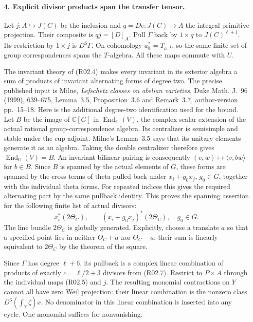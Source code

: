 \paragraph{4. Explicit divisor products span the transfer tensor.}
Let $j:A\hookrightarrow J(C)$ be the inclusion and
$q=De:J(C)\to A$ the integral primitive projection. Their composite
is $qj=[D]_A$. Pull $\Gamma$ back by $1\times q$ to
$J(C)^{\ell+1}$. Its restriction by $1\times j$ is $D^6\Gamma$.
On cohomology $a_h^*=T_{h^{-1}}$, so the same finite set of
group correspondences spans the $T$-algebra. All these maps commute
with $U$.

The invariant theory of (R02.4) makes every invariant in its exterior
algebra a sum of products of invariant alternating forms of degree
two. The precise published input is Milne, \emph{Lefschetz classes
on abelian varieties}, Duke Math. J.~96 (1999), 639--675,
Lemma~3.5, Proposition~3.6 and Remark~3.7, author-version pp.~15--18.
Here is the additional degree-two identification used for the bound.
Let $B$ be the image of $\mathbb C[G]$ in
$\operatorname{End}_{\mathbb C}(V)$, the complex scalar extension
of the actual rational group-correspondence algebra.
Its centralizer is semisimple and stable under the cup adjoint.
Milne's Lemma~3.5 says that its unitary elements generate it as an
algebra. Taking the double centralizer therefore gives
$\operatorname{End}_U(V)=B$.
An invariant bilinear pairing is consequently
$(v,w)\mapsto\langle v,bw\rangle$ for $b\in B$.
Since $B$ is spanned by the actual elements of $G$, these forms
are spanned by the cross terms of theta pulled back under
$x_i+g_0x_j$, $g_0\in G$, together with the individual theta forms.
For repeated indices this gives the required alternating part by
the same pullback identity. This proves the spanning assertion for
the following finite list of actual divisors:
\[
        x_i^*(2\Theta_C),\qquad
        (x_i+g_0x_j)^*(2\Theta_C),\quad g_0\in G.    \tag{R02.7}
\]
The line bundle $2\Theta_C$ is globally generated. Explicitly,
choose a translate $a$ so that a specified point lies in neither
$\Theta_C+a$ nor $\Theta_C-a$; their sum is linearly equivalent
to $2\Theta_C$ by the theorem of the square.

Since $\Gamma$ has degree $\ell+6$, its pullback is a complex linear
combination of products of exactly $c=\ell/2+3$ divisors from
(R02.7). Restrict to $P\times A$ through the individual maps
(R02.5) and $j$. The resulting monomial contractions on $Y$ cannot
all have zero Weil projection: their linear combination is the
nonzero class $D^6(\int_Y\zeta)x$.
No denominator in this linear combination is inserted into any
cycle. One monomial suffices for nonvanishing.

